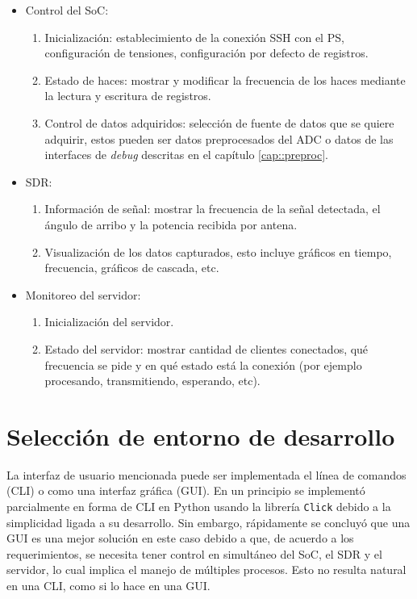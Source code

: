 \documentclass[../../main.tex]{subfiles}
\begin{document}
\begin{itemize}
    \item Control del SoC:
    \begin{enumerate}
        \item Inicialización: establecimiento de la conexión SSH con el PS, configuración de tensiones, configuración por defecto de registros.
        \item Estado de haces: mostrar y modificar la frecuencia de los haces mediante la lectura y escritura de registros.
        \item Control de datos adquiridos: selección de fuente de datos que se quiere adquirir, estos pueden ser datos preprocesados del ADC o datos de las interfaces de \textit{debug} descritas en el capítulo \ref{cap::preproc}.
    \end{enumerate}
    \item SDR:
    \begin{enumerate}
        \item Información de señal: mostrar la frecuencia de la señal detectada, el ángulo de arribo y la potencia recibida por antena.
        \item Visualización de los datos capturados, esto incluye gráficos en tiempo, frecuencia, gráficos de cascada, etc.
    \end{enumerate}
    \item Monitoreo del servidor:
    \begin{enumerate}
        \item Inicialización del servidor.
        \item Estado del servidor: mostrar cantidad de clientes conectados, qué frecuencia se pide y en qué estado está la conexión (por ejemplo procesando, transmitiendo, esperando, etc).
    \end{enumerate}
\end{itemize}

\section{Selección de entorno de desarrollo}
La interfaz de usuario mencionada puede ser implementada el línea de comandos (CLI) o como una interfaz gráfica (GUI).  En un principio se implementó parcialmente en forma de CLI en Python usando la librería \texttt{Click} \cite{click} debido a la simplicidad ligada a su desarrollo. Sin embargo, rápidamente se concluyó que una GUI es una mejor solución en este caso debido a que, de acuerdo a los requerimientos, se necesita tener control en simultáneo del SoC, el SDR y el servidor, lo cual implica el manejo de múltiples procesos. Esto no resulta natural en una CLI, como si lo hace en una GUI.
\end{document}
